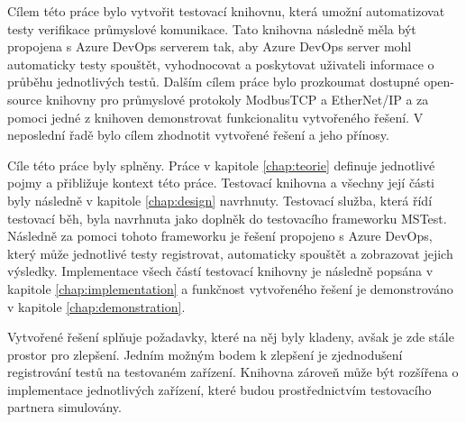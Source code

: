 \begin{conclusion}
Cílem této práce bylo vytvořit testovací knihovnu, která umožní automatizovat testy verifikace průmyslové komunikace. Tato knihovna následně měla být propojena s Azure DevOps serverem tak, aby Azure DevOps server mohl automaticky testy spouštět, vyhodnocovat a poskytovat uživateli informace o průběhu jednotlivých testů. Dalším cílem práce bylo prozkoumat dostupné open-source knihovny pro průmyslové protokoly ModbusTCP a EtherNet/IP a za pomoci jedné z knihoven demonstrovat funkcionalitu vytvořeného řešení. V neposlední řadě bylo cílem zhodnotit vytvořené řešení a jeho přínosy.

Cíle této práce byly splněny. Práce v kapitole \ref{chap:teorie} definuje jednotlivé pojmy a přibližuje kontext této práce. Testovací knihovna a všechny její části byly následně v kapitole \ref{chap:design} navrhnuty. Testovací služba, která řídí testovací běh, byla navrhnuta jako doplněk do testovacího frameworku MSTest. Následně za pomoci tohoto frameworku je řešení propojeno s Azure DevOps, který může jednotlivé testy registrovat, automaticky spouštět a zobrazovat jejich výsledky. Implementace všech částí testovací knihovny je následně popsána v kapitole \ref{chap:implementation} a funkčnost vytvořeného řešení je demonstrováno v kapitole \ref{chap:demonstration}. 

Vytvořené řešení splňuje požadavky, které na něj byly kladeny, avšak je zde stále prostor pro zlepšení. Jedním možným bodem k zlepšení je zjednodušení registrování testů na testovaném zařízení. Knihovna zároveň může být rozšířena o implementace jednotlivých zařízení, které budou prostřednictvím testovacího partnera simulovány.

\end{conclusion}